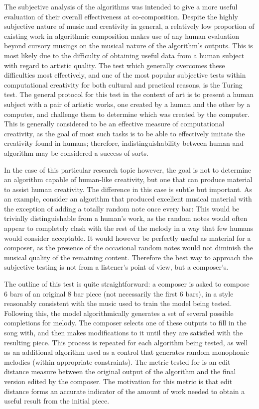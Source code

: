 \documentclass[ author={Stephen Livermore-Tozer},
				supervisor={Dr. Peter Flach},
				degree={MEng},
				title={Algorithmic Co-composition Using Machine Learning},
				subtitle={},
				type={research},
				year={2016} ]{dissertation}
\begin{document}
	The subjective analysis of the algorithms was intended to give a more useful evaluation of their overall effectiveness at co-composition. Despite the highly subjective nature of music and creativity in general, a relatively low proportion of existing work in algorithmic composition makes use of any human evaluation beyond cursory musings on the musical nature of the algorithm's outputs. This is most likely due to the difficulty of obtaining useful data from a human subject with regard to artistic quality. The test which generally overcomes these difficulties most effectively, and one of the most popular subjective tests within computational creativity for both cultural and practical reasons, is the Turing test. The general protocol for this test in the context of art is to present a human subject with a pair of artistic works, one created by a human and the other by a computer, and challenge them to determine which was created by the computer. This is generally considered to be an effective measure of computational creativity, as the goal of most such tasks is to be able to effectively imitate the creativity found in humans; therefore, indistinguishability between human and algorithm may be considered a success of sorts.
	
	In the case of this particular research topic however, the goal is not to determine an algorithm capable of human-like creativity, but one that can produce material to assist human creativity. The difference in this case is subtle but important. As an example, consider an algorithm that produced excellent musical material with the exception of adding a totally random note once every bar: This would be trivially distinguishable from a human's work, as the random notes would often appear to completely clash with the rest of the melody in a way that few humans would consider acceptable. It would however be perfectly useful as material for a composer, as the presence of the occasional random notes would not diminish the musical quality of the remaining content. Therefore the best way to approach the subjective testing is not from a listener's point of view, but a composer's.
	
	The outline of this test is quite straightforward: a composer is asked to compose 6 bars of an original 8 bar piece (not necessarily the first 6 bars), in a style reasonably consistent with the music used to train the model being tested. Following this, the model algorithmically generates a set of several possible completions for melody. The composer selects one of these outputs to fill in the song with, and then makes modifications to it until they are satisfied with the resulting piece. This process is repeated for each algorithm being tested, as well as an additional algorithm used as a control that generates random monophonic melodies (within appropriate constraints). The metric tested for is an edit distance measure between the original output of the algorithm and the final version edited by the composer. The motivation for this metric is that edit distance forms an accurate indicator of the amount of work needed to obtain a useful result from the initial piece. 
	
\end{document}
